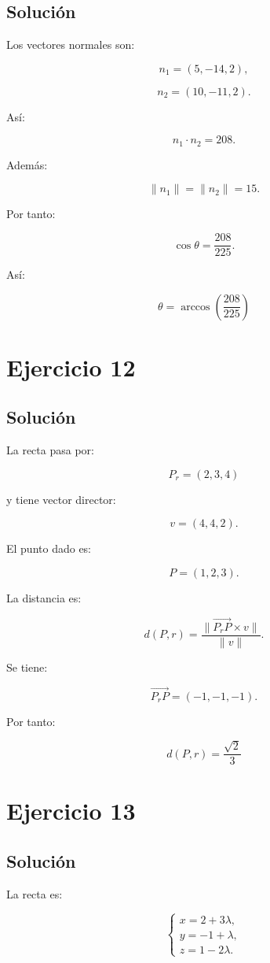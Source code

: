 \documentclass[11pt,a4paper]{article}
\begin{document}
\subsection{Solución}

Los vectores normales son:

\[
n_1=(5,-14,2),
\]

\[
n_2=(10,-11,2).
\]

Así:

\[
n_1\cdot n_2
=
208.
\]

Además:

\[
\|n_1\|
=
\|n_2\|
=
15.
\]

Por tanto:

\[
\cos\theta
=
\frac{208}{225}.
\]

Así:

\[
\boxed{
\theta
=
\arccos\left(
\frac{208}{225}
\right)
}
\]

\section{Ejercicio 12}
\subsection{Solución}

La recta pasa por:

\[
P_r=(2,3,4)
\]

y tiene vector director:

\[
v=(4,4,2).
\]

El punto dado es:

\[
P=(1,2,3).
\]

La distancia es:

\[
d(P,r)
=
\frac{
\|\overrightarrow{P_rP}\times v\|
}{
\|v\|
}.
\]

Se tiene:

\[
\overrightarrow{P_rP}
=
(-1,-1,-1).
\]

Por tanto:

\[
\boxed{
d(P,r)
=
\frac{\sqrt2}{3}
}
\]

\section{Ejercicio 13}
\subsection{Solución}

La recta es:

\[
\begin{cases}
x=2+3\lambda,\\
y=-1+\lambda,\\
z=1-2\lambda.
\end{cases}
\]
\end{document}
